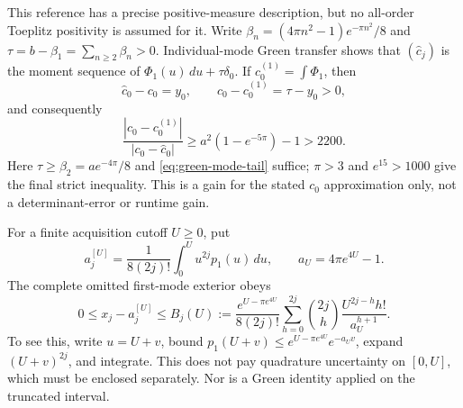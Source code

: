 This reference has a precise positive-measure description, but no
all-order Toeplitz positivity is assumed for it.  Write
\(\beta_n=(4\pi n^2-1)e^{-\pi n^2}/8\) and
\(\tau=b-\beta_1=\sum_{n\ge2}\beta_n>0\).
Individual-mode Green transfer shows that \((\widehat c_j)\) is the moment
sequence of \(\Phi_1(u)\,du+\tau\delta_0\).  If
\(c_0^{(1)}=\int\Phi_1\), then
\begin{equation}
 \widehat c_0-c_0=y_0,\qquad c_0-c_0^{(1)}=\tau-y_0>0,
\end{equation}
and consequently
\begin{equation}
 \frac{|c_0-c_0^{(1)}|}{|c_0-\widehat c_0|}
 \ge a^2(1-e^{-5\pi})-1>2200.
 \label{eq:green-boundary-gain}
\end{equation}
Here \(\tau\ge\beta_2=ae^{-4\pi}/8\) and
\eqref{eq:green-mode-tail} suffice; \(\pi>3\) and \(e^{15}>1000\)
give the final strict inequality.  This is a gain for the stated
\(c_0\) approximation only, not a determinant-error or runtime gain.

For a finite acquisition cutoff \(U\ge0\), put
\begin{equation}
 a_j^{[U]}=\frac1{8(2j)!}\int_0^Uu^{2j}p_1(u)\,du,
 \qquad a_U=4\pi e^{4U}-1.
\end{equation}
The complete omitted first-mode exterior obeys
\begin{equation}
 0\le x_j-a_j^{[U]}\le B_j(U):=
 \frac{e^{U-\pi e^{4U}}}{8(2j)!}
 \sum_{h=0}^{2j}\binom{2j}{h}
                \frac{U^{2j-h}h!}{a_U^{h+1}}.
 \label{eq:green-spatial-tail}
\end{equation}
To see this, write \(u=U+v\), bound
\(p_1(U+v)\le e^{U-\pi e^{4U}}e^{-a_Uv}\), expand
\((U+v)^{2j}\), and integrate.  This does not pay quadrature uncertainty
on \([0,U]\), which must be enclosed separately.  Nor is a Green
identity applied on the truncated interval.

